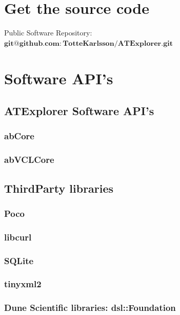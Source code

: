 \documentclass[11pt,fleqn]{book} %
\begin{document}
\begin{appendices}
\chapter{Get the source code}

Public Software Repository: $\mathbf{git@github.com:TotteKarlsson/ATExplorer.git}$

\chapter{Software API's}

\section{ATExplorer Software API's}
\subsection{abCore}
\subsection{abVCLCore}

\section{ThirdParty libraries}
\subsection{Poco}
\subsection{libcurl}
\subsection{SQLite}
\subsection{tinyxml2}
\subsection{Dune Scientific libraries: dsl::Foundation}

\end{appendices}
\end{document}
